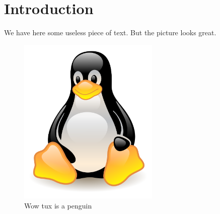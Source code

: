 \newpage
\section{Introduction}

We have here some useless piece of text. But the picture looks great.

\begin{figure}%
\centering
\includegraphics[width=0.6\textwidth]{images/tux_pic.png}
\caption{Wow tux is a penguin}
\label{img:picure_label}
\end{figure}



